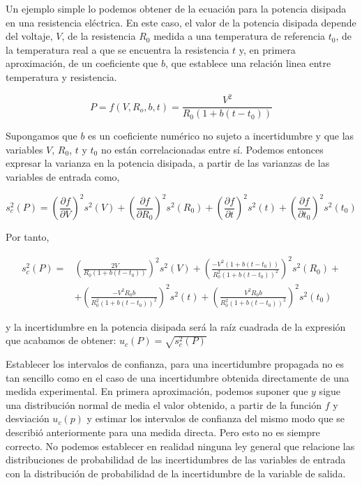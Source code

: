 Un ejemplo simple lo podemos obtener de la ecuación para la potencia disipada en una resistencia eléctrica. En este caso, el valor de la potencia disipada depende del voltaje, $V$, de la resistencia $R_0$ medida a una temperatura de referencia $t_0$, de la temperatura real a que se encuentra la resistencia $t$ y, en primera aproximación, de un coeficiente que $b$, que establece una relación linea entre temperatura y resistencia. 

\begin{equation*}
P = f(V,R_o,b,t) = \frac{V^2}{R_0\left(1+b(t-t_0)\right)}
\end{equation*}

Supongamos que $b$ es un coeficiente numérico no sujeto a incertidumbre y que las  variables $V$, $R_0$, $t$ y $t_0$ no están correlacionadas entre sí. Podemos entonces expresar la varianza  en la  potencia disipada, a partir de las varianzas de las variables de entrada como,

\begin{equation*}
s_c^2(P) = \left(\frac{\partial f}{\partial V}\right)^2 s^2(V)+ \left(\frac{\partial f}{\partial R_0}\right)^2 s^2(R_0)+ \left(\frac{\partial f}{\partial t}\right)^2 s^2(t)+\left(\frac{\partial f}{\partial t_0}\right)^2 s^2(t_0)    
\end{equation*}

Por tanto,

\begin{align*}
s_c^2(P) =& \left(\frac{2V}{R_0\left(1+b(t-t_0)\right)}\right)^2 s^2(V)+ \left(\frac{-V^2\left(1+b(t-t_0)\right)}{R_0^2\left(1+b(t-t_0)\right)^2}\right)^2 s^2(R_0)+\\
&+ \left(\frac{-V^2R_0b}{R_0^2\left(1+b(t-t_0)\right)^2}\right)^2 s^2(t)+\left(\frac{V^2R_0b}{R_0^2\left(1+b(t-t_0)\right)^2}\right)^2 s^2(t_0)    
\end{align*}

y la incertidumbre en la potencia disipada será la raíz cuadrada de la expresión que acabamos de obtener: $u_c(P) =\sqrt{s_c^2(P)} $

Establecer los intervalos de confianza, para una incertidumbre propagada no es tan sencillo como en el caso de una incertidumbre obtenida directamente de una medida experimental. En primera aproximación, podemos suponer que $y$ sigue una distribución normal de media el valor obtenido, a partir de la función $f$ y desviación $u_c(p)$ y estimar los intervalos de confianza del mismo modo que se describió anteriormente para una medida directa.  Pero esto no es siempre correcto. No podemos establecer en realidad ninguna ley general que relacione las distribuciones de probabilidad de las incertidumbres de las variables de entrada con la distribución de probabilidad de la incertidumbre de la variable de salida.

